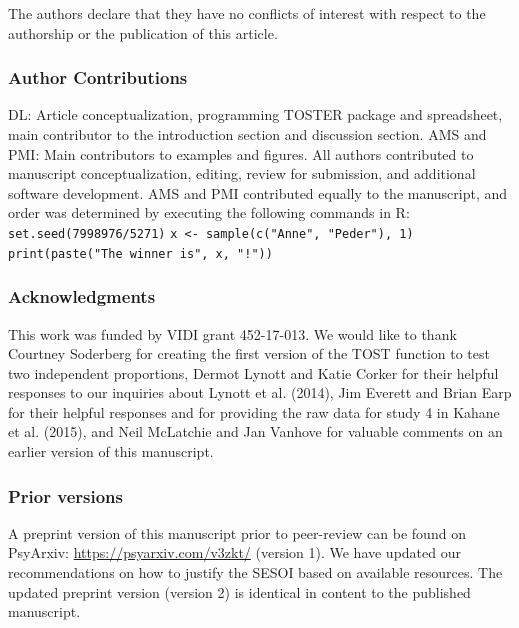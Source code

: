 \documentclass[english,floatsintext,man]{apa6}
\newcounter{author}
\theoremstyle{definition}
\theoremstyle{definition}
\theoremstyle{definition}
\theoremstyle{remark}
\begin{document}
The authors declare that they have no conflicts of interest with respect
to the authorship or the publication of this article. \newline

\subsubsection{Author Contributions}\label{author-contributions}

DL: Article conceptualization, programming TOSTER package and
spreadsheet, main contributor to the introduction section and discussion
section. AMS and PMI: Main contributors to examples and figures. All
authors contributed to manuscript conceptualization, editing, review for
submission, and additional software development. AMS and PMI contributed
equally to the manuscript, and order was determined by executing the
following commands in R: \newline
 \texttt{set.seed(7998976/5271)} \newline
 \texttt{x\ \textless{}-\ sample(c("Anne",\ "Peder"),\ 1)} \newline
 \texttt{print(paste("The\ winner\ is",\ x,\ "!"))} \newline

\subsubsection{Acknowledgments}\label{acknowledgments}

This work was funded by VIDI grant 452-17-013. We would like to thank
Courtney Soderberg for creating the first version of the TOST function
to test two independent proportions, Dermot Lynott and Katie Corker for
their helpful responses to our inquiries about Lynott et al. (2014), Jim
Everett and Brian Earp for their helpful responses and for providing the
raw data for study 4 in Kahane et al. (2015), and Neil McLatchie and Jan
Vanhove for valuable comments on an earlier version of this manuscript.
\newline

\subsubsection{Prior versions}\label{prior-versions}

A preprint version of this manuscript prior to peer-review can be found
on PsyArxiv: \url{https://psyarxiv.com/v3zkt/} (version 1). We have
updated our recommendations on how to justify the SESOI based on
available resources. The updated preprint version (version 2) is
identical in content to the published manuscript.
\end{document}
